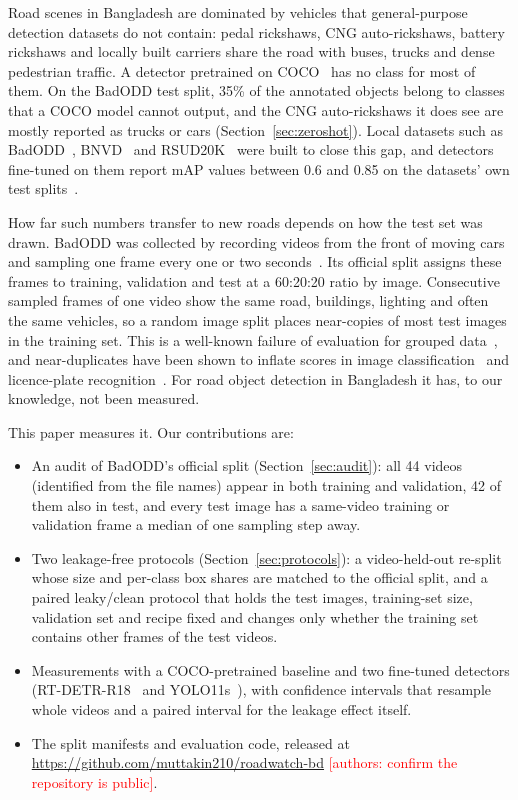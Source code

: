\documentclass[conference]{IEEEtran}
\newcommand{\TBD}[1]{\textcolor{red}{#1}}   %
\begin{document}
Road scenes in Bangladesh are dominated by vehicles that general-purpose detection datasets do not
contain: pedal rickshaws, CNG auto-rickshaws, battery rickshaws and locally built carriers share the road
with buses, trucks and dense pedestrian traffic. A detector pretrained on COCO~\cite{coco} has no class for
most of them. On the BadODD test split, 35\% of the annotated objects belong to classes that a COCO model
cannot output, and the CNG auto-rickshaws it does see are mostly reported as trucks or cars
(Section~\ref{sec:zeroshot}). Local datasets such as BadODD~\cite{badodd}, BNVD~\cite{bnvd} and
RSUD20K~\cite{rsud20k} were built to close this gap, and detectors fine-tuned on them report mAP values
between 0.6 and 0.85 on the datasets' own test splits~\cite{badodd,bnvd,rsud20k}.

How far such numbers transfer to new roads depends on how the test set was drawn. BadODD was collected by
recording videos from the front of moving cars and sampling one frame every one or two
seconds~\cite{badodd}. Its official split assigns these frames to training, validation and test at a
60:20:20 ratio by image. Consecutive sampled frames of one video show the same road, buildings, lighting and
often the same vehicles, so a random image split places near-copies of most test images in the training
set. This is a well-known failure of evaluation for grouped data~\cite{kaufman,kapoor,roberts}, and
near-duplicates have been shown to inflate scores in image classification~\cite{barz} and licence-plate
recognition~\cite{laroca}. For road object detection in Bangladesh it has, to our knowledge, not been
measured.

This paper measures it. Our contributions are:
\begin{itemize}
\item An audit of BadODD's official split (Section~\ref{sec:audit}): all 44 videos (identified from the
file names) appear in both training and validation, 42 of them also in test, and every test image has a
same-video training or validation frame a median of one sampling step away.
\item Two leakage-free protocols (Section~\ref{sec:protocols}): a video-held-out re-split whose size and
per-class box shares are matched to the official split, and a paired leaky/clean protocol that holds the test images,
training-set size, validation set and recipe fixed and changes only whether the training set contains other
frames of the test videos.
\item Measurements with a COCO-pretrained baseline and two fine-tuned detectors (RT-DETR-R18~\cite{rtdetr}
and YOLO11s~\cite{yolo11}), with confidence intervals that resample whole videos and a paired interval for
the leakage effect itself.
\item The split manifests and evaluation code, released at
\TBD{\url{https://github.com/muttakin210/roadwatch-bd}} \TBD{[authors: confirm the repository is public]}.
\end{itemize}
\end{document}

